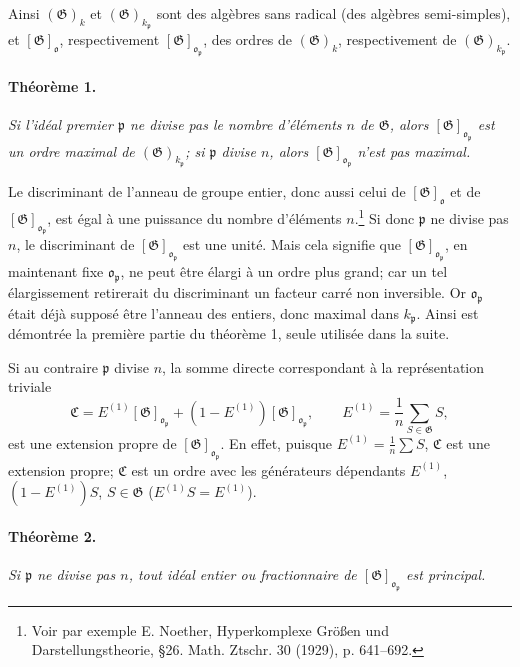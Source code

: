 Ainsi \((\mathfrak{G})_k\) et \((\mathfrak{G})_{k_{\mathfrak{p}}}\) sont des algèbres sans radical (des algèbres semi-simples), et \([\mathfrak{G}]_{\mathfrak{o}}\), respectivement \([\mathfrak{G}]_{\mathfrak{o}_{\mathfrak{p}}}\), des ordres de \((\mathfrak{G})_k\), respectivement de \((\mathfrak{G})_{k_{\mathfrak{p}}}\).

\paragraph{Théorème 1.}
\emph{Si l'idéal premier \(\mathfrak{p}\) ne divise pas le nombre d'éléments \(n\) de \(\mathfrak{G}\), alors \([\mathfrak{G}]_{\mathfrak{o}_{\mathfrak{p}}}\) est un ordre maximal de \((\mathfrak{G})_{k_{\mathfrak{p}}}\); si \(\mathfrak{p}\) divise \(n\), alors \([\mathfrak{G}]_{\mathfrak{o}_{\mathfrak{p}}}\) n'est pas maximal.}

Le discriminant de l'anneau de groupe entier, donc aussi celui de \([\mathfrak{G}]_{\mathfrak{o}}\) et de \([\mathfrak{G}]_{\mathfrak{o}_{\mathfrak{p}}}\), est égal à une puissance du nombre d'éléments \(n\).\footnote{Voir par exemple E. Noether, Hyperkomplexe Größen und Darstellungstheorie, \S 26. Math. Ztschr. 30 (1929), p. 641--692.} Si donc \(\mathfrak{p}\) ne divise pas \(n\), le discriminant de \([\mathfrak{G}]_{\mathfrak{o}_{\mathfrak{p}}}\) est une unité. Mais cela signifie que \([\mathfrak{G}]_{\mathfrak{o}_{\mathfrak{p}}}\), en maintenant fixe \(\mathfrak{o}_{\mathfrak{p}}\), ne peut être élargi à un ordre plus grand; car un tel élargissement retirerait du discriminant un facteur carré non inversible. Or \(\mathfrak{o}_{\mathfrak{p}}\) était déjà supposé être l'anneau des entiers, donc maximal dans \(k_{\mathfrak{p}}\). Ainsi est démontrée la première partie du théorème 1, seule utilisée dans la suite.

Si au contraire \(\mathfrak{p}\) divise \(n\), la somme directe correspondant à la représentation triviale
\[
        \mathfrak{C}=E^{(1)}[\mathfrak{G}]_{\mathfrak{o}_{\mathfrak{p}}}+(1-E^{(1)})[\mathfrak{G}]_{\mathfrak{o}_{\mathfrak{p}}},
        \qquad
        E^{(1)}=\frac1n\sum_{S\in\mathfrak{G}} S,
\]
est une extension propre de \([\mathfrak{G}]_{\mathfrak{o}_{\mathfrak{p}}}\). En effet, puisque \(E^{(1)}=\frac1n\sum S\), \(\mathfrak{C}\) est une extension propre; \(\mathfrak{C}\) est un ordre avec les générateurs dépendants \(E^{(1)}\), \((1-E^{(1)})S\), \(S\in\mathfrak{G}\) (\(E^{(1)}S=E^{(1)}\)).

\paragraph{Théorème 2.}
\emph{Si \(\mathfrak{p}\) ne divise pas \(n\), tout idéal entier ou fractionnaire de \([\mathfrak{G}]_{\mathfrak{o}_{\mathfrak{p}}}\) est principal.}

